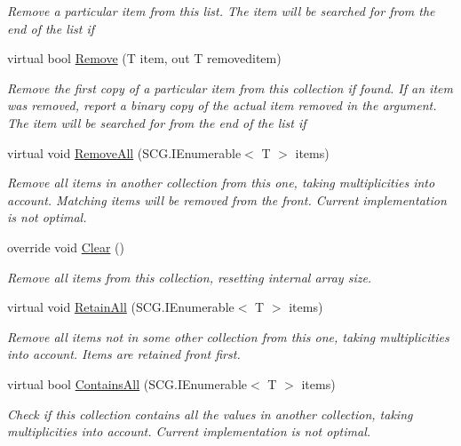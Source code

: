 \begin{DoxyCompactItemize}
\begin{DoxyCompactList}\small\item\em Remove a particular item from this list. The item will be searched for from the end of the list if \end{DoxyCompactList}\item 
virtual bool \hyperlink{class_c5_1_1_array_list_adc146d07d67bf7e96f07fb604c83b2c9}{Remove} (T item, out T removeditem)
\begin{DoxyCompactList}\small\item\em Remove the first copy of a particular item from this collection if found. If an item was removed, report a binary copy of the actual item removed in the argument. The item will be searched for from the end of the list if \end{DoxyCompactList}\item 
virtual void \hyperlink{class_c5_1_1_array_list_aaa0409bfe3256b9e5749ff8710f89b45}{Remove\+All} (S\+C\+G.\+I\+Enumerable$<$ T $>$ items)
\begin{DoxyCompactList}\small\item\em Remove all items in another collection from this one, taking multiplicities into account. Matching items will be removed from the front. Current implementation is not optimal. \end{DoxyCompactList}\item 
override void \hyperlink{class_c5_1_1_array_list_a1ed4a8838cc6a215101b6af156e7da08}{Clear} ()
\begin{DoxyCompactList}\small\item\em Remove all items from this collection, resetting internal array size. \end{DoxyCompactList}\item 
virtual void \hyperlink{class_c5_1_1_array_list_a7f3f5674779507d03f9139dea24977a2}{Retain\+All} (S\+C\+G.\+I\+Enumerable$<$ T $>$ items)
\begin{DoxyCompactList}\small\item\em Remove all items not in some other collection from this one, taking multiplicities into account. Items are retained front first. \end{DoxyCompactList}\item 
virtual bool \hyperlink{class_c5_1_1_array_list_a59f882585e714af67e2ba7211e3d3595}{Contains\+All} (S\+C\+G.\+I\+Enumerable$<$ T $>$ items)
\begin{DoxyCompactList}\small\item\em Check if this collection contains all the values in another collection, taking multiplicities into account. Current implementation is not optimal. \end{DoxyCompactList}\item 

\end{DoxyCompactItemize}
